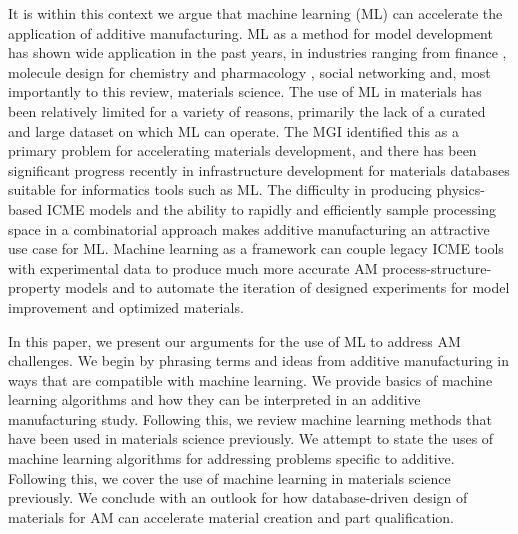 It is within this context we argue that machine learning (ML) can accelerate the application of additive manufacturing. ML as a method for model development has shown wide application in the past years, in industries ranging from finance \cite{Bose2001}, molecule design for chemistry and pharmacology \cite{Gomez-Bombarelli2018}, social networking \cite{Brusilovsky2007} and, most importantly to this review, materials science. The use of ML in materials has been relatively limited for a variety of reasons, primarily the lack of a curated and large dataset on which ML can operate. The MGI identified this as a primary problem for accelerating materials development, and there has been significant progress recently in infrastructure development for materials databases suitable for informatics tools such as ML. The difficulty in producing physics-based ICME models and the ability to rapidly and efficiently sample processing space in a combinatorial approach makes additive manufacturing an attractive use case for ML. Machine learning as a framework can couple legacy ICME tools with experimental data to produce much more accurate AM process-structure-property models and to automate the iteration of designed experiments for model improvement and optimized materials.

In this paper, we present our arguments for the use of ML to address AM challenges. We begin by phrasing terms and ideas from additive manufacturing in ways that are compatible with machine learning. We provide basics of machine learning algorithms and how they can be interpreted in an additive manufacturing study. Following this, we review machine learning methods that have been used in materials science previously. We attempt to state the uses of machine learning algorithms for addressing problems specific to additive. Following this, we cover the use of machine learning in materials science previously. We conclude with an outlook for how database-driven design of materials for AM can accelerate material creation and part qualification.
